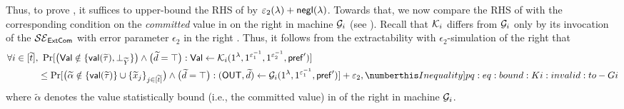 Thus, to prove , it suffices to upper-bound the RHS of   by {$\varepsilon_2(\lambda)+\mathsf{negl}(\lambda)$}. Towards that, we now compare the RHS of  with the corresponding condition on the {\em committed} value in  on the right in machine $\mathcal{G}_i$ (see ). Recall that $\mathcal{K}_i$ differs from $\mathcal{G}_i$ only by its invocation of the $\mathcal{SE}_\mathsf{ExtCom}$ with error parameter {$\epsilon_2$} in the right . Thus, it follows from the extractability with $\epsilon_2$-simulation of the right  that
\begin{align*}
    \forall i \in [\tilde{t}],&~\Pr[\big(\msf{Val} \notin \Set{\msf{val}(\tilde{\tau}),\bot_{\tilde{Y}}}\big) \wedge \big( \tilde{d} = \top \big): \msf{Val} \gets \mcal{K}_i{(1^\secpar, 1^{\epsilon_1^{-1}}, 1^{\epsilon_2^{-1}}, \msf{pref}')}] \\
    & \leq \Pr[\big(\tilde{\alpha} \notin \Set{\msf{val}(\tilde{\tau})} \cup \Set{\tilde{x}_j}_{j \in [\tilde{t}]}\big) \wedge \big(\tilde{d} = \top \big): (\OUT,\tilde{d})\gets \mcal{G}_i{(1^\secpar, 1^{\epsilon_1^{-1}},  \msf{pref}')}] + \epsilon_2, \numberthis \label[Inequality]{pq:eq:bound:Ki:invalid:to-Gi}
\end{align*}
where $\tilde{\alpha}$ denotes the value statistically bound (i.e., the committed value) in  of the right in machine $\mathcal{G}_i$.

